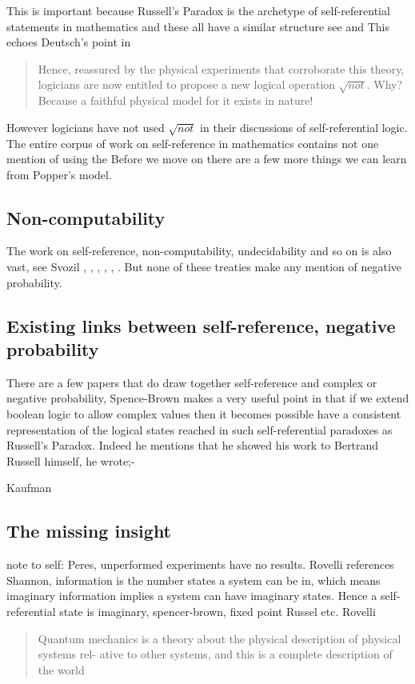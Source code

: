 \documentclass{article}
\begin{document}
This is important because Russell's Paradox is the archetype of self-referential statements in mathematics and these all have a similar structure see \autocite{Lawvere1969DiagonalCategories} and \autocite{Yanofsky2003} This echoes Deutsch's point in \autocite{deutsch_1999} 
\begin{quotation}
    Hence, reassured by the physical experiments that corroborate this theory, logicians are now entitled to propose a new logical operation $\sqrt{not}$. Why? Because a faithful physical model for it exists in nature!
\end{quotation}
However logicians have not used $\sqrt{not}$ in their discussions of self-referential logic. The entire corpus of work on self-reference in mathematics contains not one mention of using the 
Before we move on there are a few more things we can learn from Popper's model. 
\subsection{Non-computability}
The work on self-reference, non-computability, undecidability and so on is also vast, see Svozil \autocite{svozil_k_2018b}, \autocite{sep-self-reference_2017}, \autocite{szangolies_2020, szangolies_j_2018} \autocite{Bartlett_S_1992, bartlett_S_J-1987}, \autocite{cook_2004, Cook_RT_2014}, \autocite{Yanofsky2003}, \autocite{Lawvere1969DiagonalCategories}. But none of these treaties make any mention of negative probability. 
\subsection{Existing links between self-reference, negative probability}
There are a few papers that do draw together self-reference and complex or negative probability, Spence-Brown makes a very useful point in \autocite{Spence-Brown-1969} that if we extend boolean logic to allow complex values then it becomes possible have a consistent representation of the logical states reached in such self-referential paradoxes as Russell's Paradox. Indeed he mentions that he showed his work to Bertrand Russell himself, he wrote;-

Kaufman  

\subsection{The missing insight}


note to self: Peres, unperformed experiments have no results. Rovelli \autocite{Rovelli1996a} references Shannon, information is the number states a system can be in, which means imaginary information implies a system can have imaginary states. Hence a self-referential state is imaginary, spencer-brown, fixed point Russel etc. 
Rovelli \autocite{Rovelli1996a}
\begin{quotation}
    Quantum mechanics is a theory about the
physical description of physical systems rel-
ative to other systems, and this is a complete
description of the world
\end{quotation}
\end{document}
